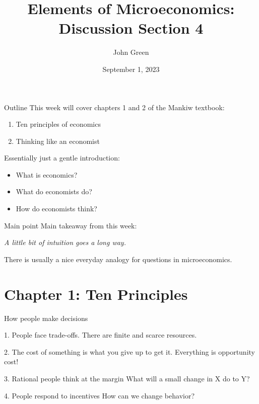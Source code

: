 \documentclass{beamer}
\title{Elements of Microeconomics: \\
       Discussion Section 4}
\author{John Green}
\date{September 1, 2023}
\begin{document}
\begin{frame}
    \titlepage 
\end{frame}

\begin{frame}{Outline}
    This week will cover chapters 1 and 2 of the Mankiw textbook:
    \begin{enumerate}
        \item Ten principles of economics
        \item Thinking like an economist
    \end{enumerate}

    \medskip

    Essentially just a gentle introduction: 
    \begin{itemize}
        \item What is economics?
        \item What do economists do?
        \item How do economists think?
    \end{itemize}
\end{frame}

\begin{frame}{Main point}
    \centering
    Main takeaway from this week:

    \vspace{12pt}

    \Large \textit{A little bit of intuition goes a long way.}

    \normalsize There is usually a nice everyday analogy for questions in microeconomics. 
\end{frame}

\section{Chapter 1: Ten Principles}

\begin{frame}{How people make decisions}
    \begin{block}{1. People face trade-offs.}
        There are finite and scarce resources.
    \end{block}

    \begin{block}{2. The cost of something is what you give up to get it.}
        Everything is opportunity cost!
    \end{block}

    \begin{block}{3. Rational people think at the margin}
        What will a small change in X do to Y?
    \end{block}

    \begin{block}{4. People respond to incentives}
        How can we change behavior?
    \end{block}
\end{frame} 
\end{document}
